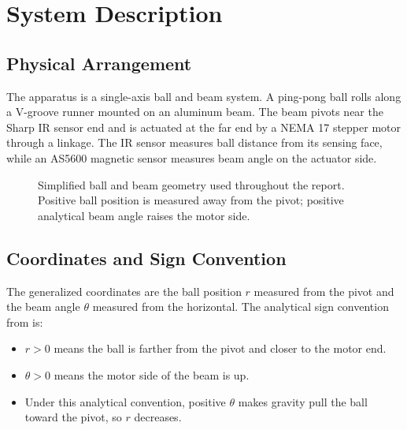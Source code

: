 \chapter{System Description}

\section{Physical Arrangement}

The apparatus is a single-axis ball and beam system. A ping-pong ball rolls along a
V-groove runner mounted on an aluminum beam. The beam pivots near the Sharp IR sensor
end and is actuated at the far end by a NEMA 17 stepper motor through a linkage. The
IR sensor measures ball distance from its sensing face, while an AS5600 magnetic sensor
measures beam angle on the actuator side.

\begin{figure}[tbp]
  \centering
  \caption{Simplified ball and beam geometry used throughout the report. Positive
  ball position is measured away from the pivot; positive analytical beam angle raises
  the motor side.}
  \label{fig:system_geometry}
\end{figure}

\section{Coordinates and Sign Convention}

The generalized coordinates are the ball position $r$ measured from the pivot and the
beam angle $\theta$ measured from the horizontal. The analytical sign convention from
 is:

\begin{itemize}
  \item $r > 0$ means the ball is farther from the pivot and closer to the motor end.
  \item $\theta > 0$ means the motor side of the beam is up.
  \item Under this analytical convention, positive $\theta$ makes gravity pull the
  ball toward the pivot, so $r$ decreases.
\end{itemize}

